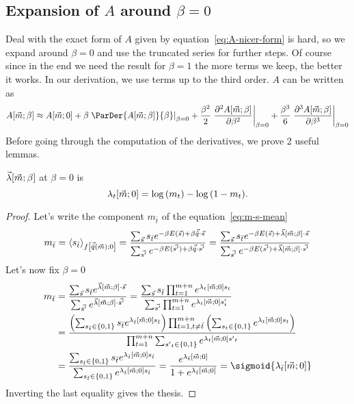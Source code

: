 \subsection[Expansion of A around \textbeta=0]{Expansion of \(A\) around \(\beta=0\)}
Deal with the exact form of \(A\) given by equation~\eqref{eq:A-nicer-form} is hard,
so we expand around \(\beta = 0\) and use the truncated series for further steps.
Of course since in the end we need the result for \(\beta=1\) the more terms we keep, the better
it works. In our derivation, we use terms up to the third order.
\(A\) can be written as
\[
  A{\left[\vec{m};\beta\right]} \approx
    A{\left[\vec{m};0\right]} + 
    \beta \left.\ParDer{A{\left[\vec{m};\beta\right]}}{\beta}\right|_{\beta=0} +
    \frac{\beta^2}{2}
      \left.\frac{\partial^2A{\left[\vec{m};\beta\right]}}{\partial\beta^2}\right|_{\beta=0}+
    \frac{\beta^3}{6} 
      \left.\frac{\partial^3A{\left[\vec{m};\beta\right]}}{\partial\beta^3}\right|_{\beta=0}    
\]
Before going through the computation of the derivatives, we prove 2 useful lemmas.
\begin{lemma} \label{lem:lambda-t-zero}
  \(\vec{\lambda}{\left[\vec{m};\beta\right]}\) at \(\beta = 0\) is
  \[
    \lambda_t{\left[\vec{m};0\right]} = \log{\left(m_t\right)} - \log{\left(1-m_t\right)}.
  \]
  \begin{proof}
    Let's write the component \(m_{\bar{t}}\) of the equation~\eqref{eq:m-s-mean}
    \[
      m_{\bar{t}} = \left\langle s_{\bar{t}}\right\rangle_{f{\left[\vec{\hat{q}}{(\vec{m})};0\right]}}
      = \frac{\sum_{\vec{s}} s_{\bar{t}} e^{-\beta E(\vec{s}) + \beta \vec{\hat{q}}\cdot\vec{s}}}
             {\sum_{\vec{s'}}e^{-\beta E(\vec{s'}) + \beta \vec{\hat{q}}\cdot\vec{s'}}}
      = \frac{\sum_{\vec{s}} s_{\bar{t}} e^{-\beta E(\vec{s}) + \vec{\lambda}{\left[\vec{m};\beta\right]}\cdot\vec{s}}}
             {\sum_{\vec{s'}}e^{-\beta E(\vec{s'}) + \vec{\lambda}{\left[\vec{m};\beta\right]}\cdot\vec{s'}}}
    \]
    Let's now fix \(\beta=0\)
    \begin{align*} \displaystyle
      m_{\bar{t}} &= \frac{\sums s_{\bar{t}} e^{\Lambd{\vec{m}}{\beta}\cdot\vec{s}}}
                          {\sum_{\vec{s'}}e^{\Lambd{\vec{m}}{\beta}\cdot\vec{s'}}} 
                   = \frac{\sums s_{\bar{t}} \prodt e^{\lgtmz s_t}}
                          {\sum_{\vec{s'}}\prodt e^{\lgtmz s'_t}} \\
                  &= \frac{\left(\sumstbar s_{\bar{t}}e^{\lgtbarmz s_{\bar{t}}}\right)
                           \prod_{t=1,t\neq{\bar{t}}}^{m+n}\left(\sumst e^{\lgtmz s_t}\right)}
                          {\prodt\sumstprim e^{\lgtmz {s'}_t}} \\
                  &= \frac{\sumstbar s_{\bar{t}}e^{\lgtbarmz s_{\bar{t}}}}
                          {\sumstbar e^{\lgtbarmz s_{\bar{t}}}}
                   = \frac{e^{\lgtbarmz}}{1+e^{\lgtbarmz}} = \sigmoid{\lgtbarmz}              
    \end{align*}
    Inverting the last equality gives the thesis.
  \end{proof}
\end{lemma}

